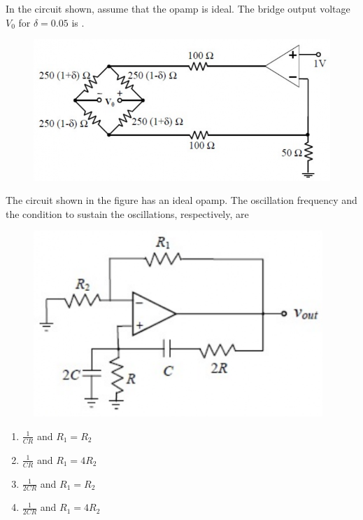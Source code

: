     \hfill{}

    \item In the circuit shown, assume that the opamp is ideal. The bridge output voltage $V_{0}$  for $\delta=0.05$ is \underline{\hspace{2cm}}.
    \begin{figure}[H]
        \centering
        \includegraphics[width=0.7\columnwidth]{figs/q50.png}
        \caption*{}
        \label{fig:q50}
    \end{figure}
    
    \hfill{}

    \item The circuit shown in the figure has an ideal opamp. The oscillation frequency and the condition to sustain the oscillations, respectively, are
    \begin{figure}[H]
        \centering
        \includegraphics[width=0.5\columnwidth]{figs/q51.png}
        \caption*{}
        \label{fig:q51}
    \end{figure}
    \begin{enumerate}
        \item $\frac{1}{CR}$ and $R_{1}=R_{2}$
        \item $\frac{1}{CR}$ and $R_{1}=4R_{2}$
        \item $\frac{1}{2CR}$ and $R_{1}=R_{2}$
        \item $\frac{1}{2CR}$ and $R_{1}=4R_{2}$
    \end{enumerate}
    
    \hfill{}

